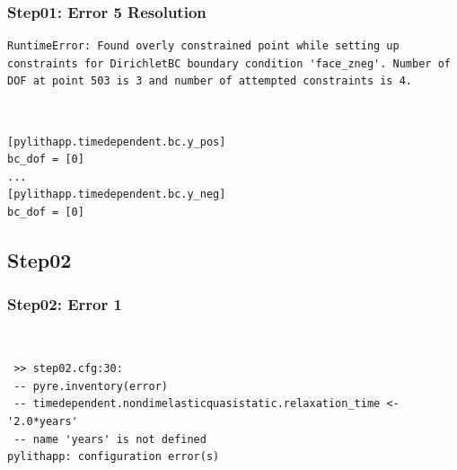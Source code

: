 \documentclass{beamer}
\begin{document}
\begin{frame}[fragile]
  \frametitle{Step01: Error 5 Resolution}

\begin{lstlisting}
RuntimeError: Found overly constrained point while setting up constraints for DirichletBC boundary condition 'face_zneg'. Number of DOF at point 503 is 3 and number of attempted constraints is 4.
\end{lstlisting}\pause
{} \pause\\
\begin{lstlisting}
[pylithapp.timedependent.bc.y_pos]
bc_dof = [0]
...
[pylithapp.timedependent.bc.y_neg]
bc_dof = [0]
\end{lstlisting}

\end{frame}


\subsection{Step02}

\begin{frame}[fragile]
  \frametitle{Step02: Error 1}

\\
\begin{lstlisting}
 >> step02.cfg:30:
 -- pyre.inventory(error)
 -- timedependent.nondimelasticquasistatic.relaxation_time <- '2.0*years'
 -- name 'years' is not defined
pylithapp: configuration error(s)
\end{lstlisting}
  
\end{frame}
\end{document}
